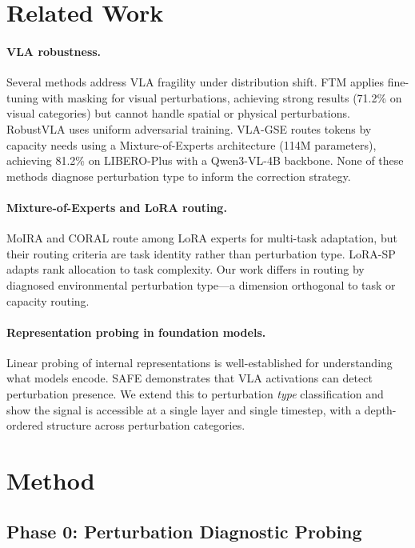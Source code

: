 \documentclass[letterpaper]{article}
\begin{document}
\section{Related Work}
\label{sec:related}

\paragraph{VLA robustness.}
Several methods address VLA fragility under distribution shift. FTM applies fine-tuning with masking for visual perturbations, achieving strong results (71.2\% on visual categories) but cannot handle spatial or physical perturbations. RobustVLA uses uniform adversarial training. VLA-GSE routes tokens by capacity needs using a Mixture-of-Experts architecture (114M parameters), achieving 81.2\% on LIBERO-Plus with a Qwen3-VL-4B backbone. None of these methods diagnose perturbation type to inform the correction strategy.

\paragraph{Mixture-of-Experts and LoRA routing.}
MoIRA and CORAL route among LoRA experts for multi-task adaptation, but their routing criteria are task identity rather than perturbation type. LoRA-SP adapts rank allocation to task complexity. Our work differs in routing by diagnosed environmental perturbation type---a dimension orthogonal to task or capacity routing.

\paragraph{Representation probing in foundation models.}
Linear probing of internal representations is well-established for understanding what models encode. SAFE demonstrates that VLA activations can detect perturbation presence. We extend this to perturbation \emph{type} classification and show the signal is accessible at a single layer and single timestep, with a depth-ordered structure across perturbation categories.

\section{Method}
\label{sec:method}

\subsection{Phase 0: Perturbation Diagnostic Probing}
\label{sec:phase0}
\end{document}

